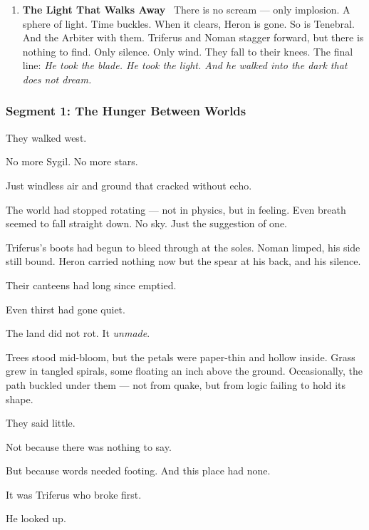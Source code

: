 \documentclass[9pt]{article}
\begin{document}
\begin{center}
\begin{enumerate}
\vspace{.3in}

\item \textbf{The Light That Walks Away} \
There is no scream — only implosion. A sphere of light. Time buckles. When it clears, Heron is gone. So is Tenebral. And the Arbiter with them. Triferus and Noman stagger forward, but there is nothing to find. Only silence. Only wind. They fall to their knees. The final line:
\textit{He took the blade. He took the light. And he walked into the dark that does not dream.}

\end{enumerate}
\end{center}

\newpage

\subsubsection*{Segment 1: The Hunger Between Worlds}

They walked west.

No more Sygil. No more stars.

Just windless air and ground that cracked without echo.

The world had stopped rotating — not in physics, but in feeling. Even breath seemed to fall straight down. No sky. Just the suggestion of one.

Triferus’s boots had begun to bleed through at the soles. Noman limped, his side still bound. Heron carried nothing now but the spear at his back, and his silence.

Their canteens had long since emptied.

Even thirst had gone quiet.

\bigskip

The land did not rot. It \textit{unmade}.

Trees stood mid-bloom, but the petals were paper-thin and hollow inside. Grass grew in tangled spirals, some floating an inch above the ground. Occasionally, the path buckled under them — not from quake, but from logic failing to hold its shape.

They said little.

Not because there was nothing to say.

But because words needed footing. And this place had none.

\bigskip

It was Triferus who broke first.

He looked up.
\end{document}
